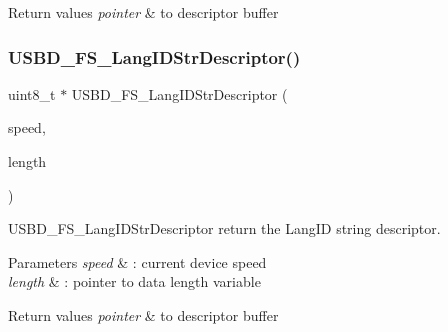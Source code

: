 \begin{DoxyRetVals}{Return values}
{\em pointer} & to descriptor buffer \\
\hline
\end{DoxyRetVals}
\hypertarget{group___u_s_b_d___d_e_s_c___private___functions_gac02628ceb6a6a071e192dcb85063c0cc}{}\label{group___u_s_b_d___d_e_s_c___private___functions_gac02628ceb6a6a071e192dcb85063c0cc} 
\subsubsection{\texorpdfstring{U\+S\+B\+D\+\_\+\+F\+S\+\_\+\+Lang\+I\+D\+Str\+Descriptor()}{USBD\_FS\_LangIDStrDescriptor()}}
{\footnotesize\ttfamily uint8\+\_\+t $\ast$ U\+S\+B\+D\+\_\+\+F\+S\+\_\+\+Lang\+I\+D\+Str\+Descriptor (\begin{DoxyParamCaption}\item[{U\+S\+B\+D\+\_\+\+Speed\+Type\+Def}]{speed,  }\item[{uint16\+\_\+t $\ast$}]{length }\end{DoxyParamCaption})}



U\+S\+B\+D\+\_\+\+F\+S\+\_\+\+Lang\+I\+D\+Str\+Descriptor return the Lang\+ID string descriptor. 


\begin{DoxyParams}{Parameters}
{\em speed} & \+: current device speed \\
\hline
{\em length} & \+: pointer to data length variable \\
\hline
\end{DoxyParams}

\begin{DoxyRetVals}{Return values}
{\em pointer} & to descriptor buffer \\
\hline
\end{DoxyRetVals}
\hypertarget{group___u_s_b_d___d_e_s_c___private___functions_ga6427a671827813efe1a46c3dfcb05683}{}\label{group___u_s_b_d___d_e_s_c___private___functions_ga6427a671827813efe1a46c3dfcb05683} 

